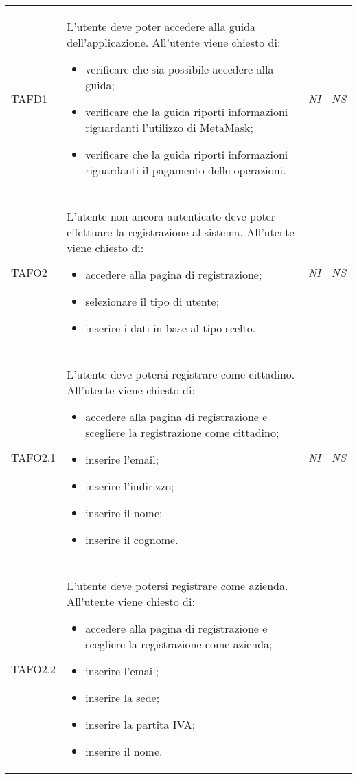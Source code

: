 \begin{longtable}{ >{\centering}p{} >{}p{}
			>{\centering}p{} >{\centering}p{}}
\hypertarget{TAFD1}{TAFD1} & L'utente deve poter accedere alla guida dell'applicazione. All'utente viene
		 chiesto di:
		 \begin{itemize}
		 	\item verificare che sia possibile accedere alla guida;
		 	\item verificare che la guida riporti informazioni riguardanti l'utilizzo di
		 	MetaMask\glo{};
		 	\item verificare che la guida riporti informazioni riguardanti il pagamento
		 	delle operazioni. 
		 \end{itemize} & \textit{NI} & \textit{NS}\\ \tabularnewline
\hypertarget{TAFO2}{TAFO2} & L'utente non ancora autenticato deve poter effettuare la registrazione al
		 sistema. All'utente viene chiesto di:
		 \begin{itemize}
		 	\item accedere alla pagina di registrazione;
		 	\item selezionare il tipo di utente;
		 	\item inserire i dati in base al tipo scelto.
		 \end{itemize} & \textit{NI} & \textit{NS}\\ \tabularnewline
\hypertarget{TAFO2.1}{TAFO2.1} & L'utente deve potersi registrare come cittadino. All'utente viene chiesto di:
		 \begin{itemize}
		 	\item accedere alla pagina di registrazione e scegliere la registrazione
		 	come cittadino;
		 	\item inserire l'email;
		 	\item inserire l'indirizzo;
		 	\item inserire il nome;
		 	\item inserire il cognome.
		 \end{itemize} & \textit{NI} & \textit{NS}\\ \tabularnewline
\hypertarget{TAFO2.2}{TAFO2.2} & L'utente deve potersi registrare come azienda. All'utente viene chiesto di:
		 \begin{itemize}
		 	\item accedere alla pagina di registrazione e scegliere la registrazione
		 	come azienda;
		 	\item inserire l'email;
		 	\item inserire la sede;
		 	\item inserire la partita IVA;
		 	\item inserire il nome.

\end{itemize}
\end{longtable}
